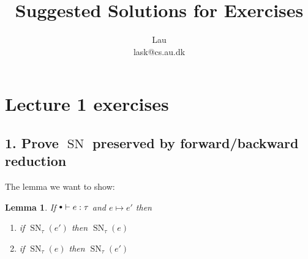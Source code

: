 \documentclass[a4paper,10pt,fleqn]{article}
\author{Lau\\lask@cs.au.dk}
\title{Suggested Solutions for Exercises}
\DeclareMathOperator{\SNPred}{SN}
\newcommand{\evalto}{\ensuremath{\mapsto}}
\newcommand{\mtenv}{{\raisebox{1.5pt}{$\scriptstyle\bullet$}}}
\newcommand{\SN}[2]{\ensuremath{\SNPred_{#1}(#2)}}
\newtheorem*{lemma}{Lemma}
\begin{document}
\maketitle
\section*{Lecture 1 exercises}
\subsection*{1. Prove $\SNPred$ preserved by forward/backward reduction}
The lemma we want to show:
\begin{lemma}
  If $\mtenv \vdash e : \tau$ and $e \evalto e'$ then
  \begin{enumerate}
  \item if $\SN{\tau}{e'}$ then $\SN{\tau}{e}$
  \item if $\SN{\tau}{e}$ then $\SN{\tau}{e'}$
  \end{enumerate}
\end{lemma}
\end{document}
